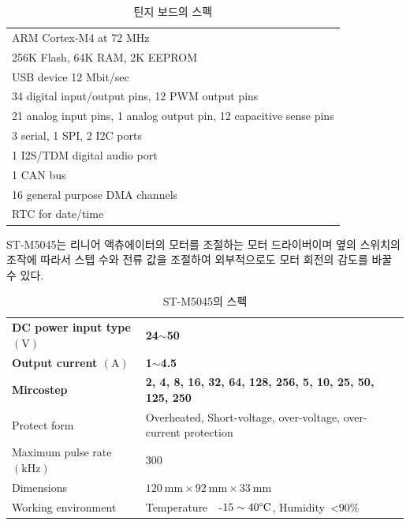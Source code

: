 \begin{table}[H]
    \centering
    \caption{틴지 보드의 스펙}
    \begin{tabular}{l}
        \hline
        ARM Cortex-M4 at 72 MHz\\
        256K Flash, 64K RAM, 2K EEPROM\\
        USB device 12 Mbit/sec\\
        34 digital input/output pins, 12 PWM output pins\\
        21 analog input pins, 1 analog output pin, 12 capacitive sense pins\\
        3 serial, 1 SPI, 2 I2C ports\\
        1 I2S/TDM digital audio port\\
        1 CAN bus\\
        16 general purpose DMA channels\\
        RTC for date/time\\
        \hline
    \end{tabular}
    \label{Specification of Teensy Board}
\end{table}

ST-M5045는 리니어 액츄에이터의 모터를 조절하는 모터 드라이버이며 옆의 스위치의 조작에 따라서 스텝 수와 전류 값을 조절하여 외부적으로도 모터 회전의 감도를 바꿀 수 있다.

\begin{table}[H]
    \centering
    \captionsetup{justification=centering}
    \caption{ST-M5045의 스펙}
    \begin{tabular}{ll}
        \hline
        \textbf{DC power input type $(\mathrm{V})$}  & \textbf{24$\sim$50}      \\
        \textbf{Output current $(\mathrm{A})$}       & \textbf{1$\sim$4.5}      \\
        \textbf{Mircostep}           & \textbf{2, 4, 8, 16, 32, 64, 128, 256, 5, 10, 25, 50, 125, 250               }                \\
        Protect form        & Overheated, Short-voltage, over-voltage, over-current protection \\
        Maximum pulse rate $(\mathrm{kHz})$ & 300             \\
        Dimensions               & $120\mathrm{~mm} \times92\mathrm{~mm}\times33\mathrm{~mm}$ \\
        Working environment & Temperature~~-$15\sim40\mathrm{\degree C}$, Humidity~\textless{}$90\%$ \\ 
        \hline
    \end{tabular}
    \label{Specification of ST-M5045}
\end{table}

